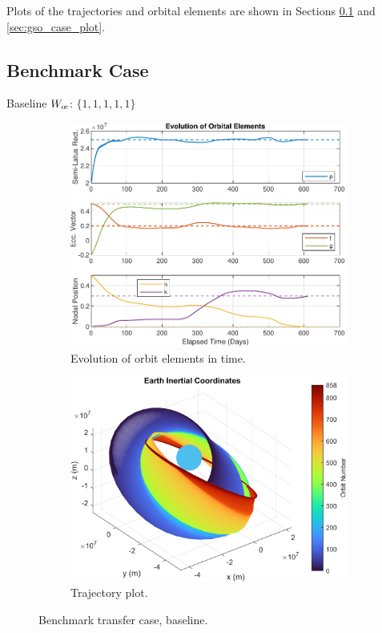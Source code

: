 Plots of the trajectories and orbital elements are shown in Sections \ref{sec:bench_case_plot} and \ref{sec:gso_case_plot}.

\subsection{Benchmark Case}
\label{sec:bench_case_plot}
Baseline $W_{\moe}$: $\{1, 1, 1, 1, 1\}$
\begin{figure}[H]
    \centering
    \begin{subfigure}[t]{0.49\textwidth}
    \includegraphics[width=\textwidth]{figures/benchmark_transfer/orbital_elements.pdf}
    \caption{Evolution of orbit elements in time.}
    \label{fig:results_benchmark_a}
    \end{subfigure}
    \begin{subfigure}[t]{0.49\textwidth}
    \includegraphics[width=\textwidth]{figures/benchmark_transfer/trajectory_plot.png}
    \caption{Trajectory plot.}
    \label{fig:results_benchmark_b}
    \end{subfigure}
    \caption{Benchmark transfer case, baseline.}
    \label{fig:results_benchmark}
\end{figure}

